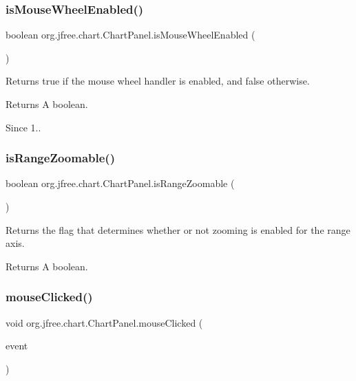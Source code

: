 \subsubsection{\texorpdfstring{is\+Mouse\+Wheel\+Enabled()}{isMouseWheelEnabled()}}
{\footnotesize\ttfamily boolean org.\+jfree.\+chart.\+Chart\+Panel.\+is\+Mouse\+Wheel\+Enabled (\begin{DoxyParamCaption}{ }\end{DoxyParamCaption})}

Returns {\ttfamily true} if the mouse wheel handler is enabled, and {\ttfamily false} otherwise.

\begin{DoxyReturn}{Returns}
A boolean.
\end{DoxyReturn}
\begin{DoxySince}{Since}
1.. 
\end{DoxySince}
\mbox{\label{classorg_1_1jfree_1_1chart_1_1_chart_panel_a0742636acafe8eee200bc16f1083859d}} 
\subsubsection{\texorpdfstring{is\+Range\+Zoomable()}{isRangeZoomable()}}
{\footnotesize\ttfamily boolean org.\+jfree.\+chart.\+Chart\+Panel.\+is\+Range\+Zoomable (\begin{DoxyParamCaption}{ }\end{DoxyParamCaption})}

Returns the flag that determines whether or not zooming is enabled for the range axis.

\begin{DoxyReturn}{Returns}
A boolean. 
\end{DoxyReturn}
\mbox{\label{classorg_1_1jfree_1_1chart_1_1_chart_panel_a74e83cf3565cf9f26ac19d86f889b032}} 
\subsubsection{\texorpdfstring{mouse\+Clicked()}{mouseClicked()}}
{\footnotesize\ttfamily void org.\+jfree.\+chart.\+Chart\+Panel.\+mouse\+Clicked (\begin{DoxyParamCaption}\item[{Mouse\+Event}]{event }\end{DoxyParamCaption})}

